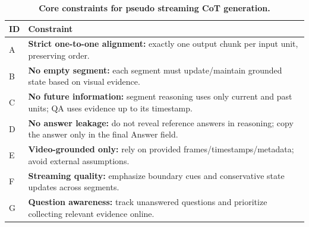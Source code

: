 \documentclass{article}
\begin{document}
\begin{table}[H]
\caption{\textbf{Core constraints for pseudo streaming CoT generation.}}
\label{tab:prompt-constraints}
\centering
\small
\begin{tabular}{p{}p{}}
\toprule
\textbf{ID} & \textbf{Constraint} \\
\midrule
A & \textbf{Strict one-to-one alignment:} exactly one output chunk per input unit, preserving order. \\
B & \textbf{No empty segment:} each segment must update/maintain grounded state based on visual evidence. \\
C & \textbf{No future information:} segment reasoning uses only current and past units; QA uses evidence up to its timestamp. \\
D & \textbf{No answer leakage:} do not reveal reference answers in reasoning; copy the answer only in the final Answer field. \\
E & \textbf{Video-grounded only:} rely on provided frames/timestamps/metadata; avoid external assumptions. \\
F & \textbf{Streaming quality:} emphasize boundary cues and conservative state updates across segments. \\
G & \textbf{Question awareness:} track unanswered questions and prioritize collecting relevant evidence online. \\
\bottomrule
\end{tabular}
\end{table}
\end{document}

